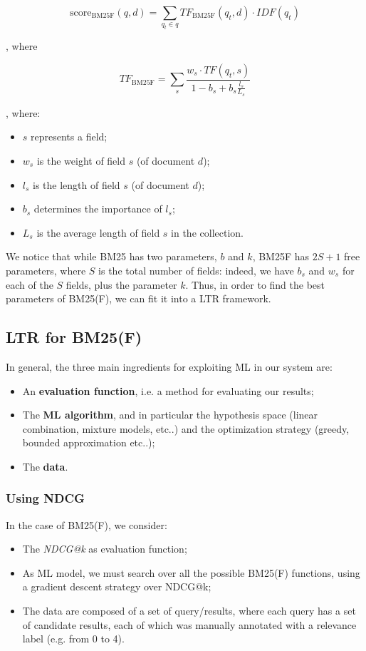 $$
\text{score}_{\text{BM25F}}(q,d) = \sum_{q_t \in q} TF_{\text{BM25F}}(q_t,d) \cdot IDF(q_t)
$$

, where 

$$
TF_{\text{BM25F}} = \sum_{s} \frac{w_s \cdot TF(q_t, s)}{1 - b_s + b_s \frac{l_s}{L_s}}
$$

, where:

\begin{itemize}
    \item $s$ represents a field;
    \item $w_s$ is the weight of field $s$ (of document $d$);
    \item $l_s$ is the length of field $s$ (of document $d$);
    \item $b_s$ determines the importance of $l_s$;
    \item $L_s$ is the average length of field $s$ in the collection.
\end{itemize}

We notice that while BM25 has two parameters, $b$ and $k$, BM25F has $2S + 1$ free parameters, where $S$ is the total number of fields: indeed, we have $b_s$ and $w_s$ for each of the $S$ fields, plus the parameter $k$. Thus, in order to find the best parameters of BM25(F), we can fit it into a LTR framework.

\subsection{LTR for BM25(F)}
In general, the three main ingredients for exploiting ML in our system are:

\begin{itemize}
    \item An \textbf{evaluation function}, i.e. a method for evaluating our results;
    \item The \textbf{ML algorithm}, and in particular the hypothesis space (linear combination, mixture models, etc..) and the optimization strategy (greedy, bounded approximation etc..);
    \item The \textbf{data}.
\end{itemize}

\subsubsection{Using NDCG}

In the case of BM25(F), we consider:

\begin{itemize}
    \item The \textit{NDCG@k} as evaluation function;
    \item As ML model, we must search over all the possible BM25(F) functions, using a gradient descent strategy over NDCG@k;
    \item The data are composed of a set of query/results, where each query has a set of candidate results, each of which was manually annotated with a relevance label (e.g. from 0 to 4).
\end{itemize}

